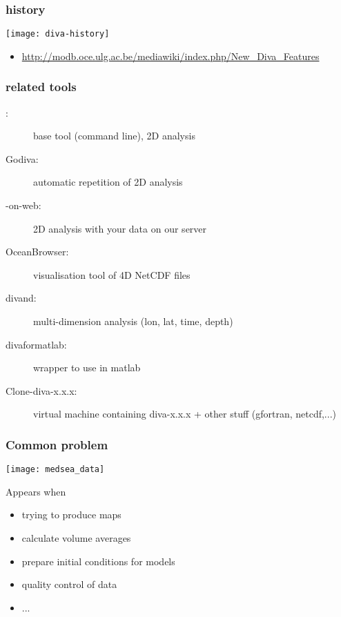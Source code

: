 \begin{frame}
\frametitle{\diva history}

\texttt{[image: diva-history]}
\begin{itemize}
\item \url{http://modb.oce.ulg.ac.be/mediawiki/index.php/New_Diva_Features}
\end{itemize}
\end{frame}

\begin{frame}
\frametitle{\diva related tools}

\begin{description}
\item[\diva:] base tool (command line), 2D analysis
\item[\textsf{Godiva}:] automatic repetition of 2D analysis  
\item[\diva-on-web:] 2D analysis with your data on our server  
\item[OceanBrowser:] visualisation tool of 4D NetCDF files
\item[\textsf{divand}:] multi-dimension analysis (lon, lat, time, depth)
\item[\textsf{divaformatlab}:] wrapper to use in matlab
\item[Clone-diva-x.x.x:] virtual machine containing diva-x.x.x + other stuff (gfortran, netcdf,...)
\end{description}
\end{frame}


\begin{frame}
\frametitle{Common problem}
\centerline{
\texttt{[image: medsea\_data]}
}

Appears when
\begin{itemize}
\item trying to produce maps
\item calculate volume averages
\item prepare initial conditions for models
\item quality control of data 
\item ...
\end{itemize}
\end{frame}

